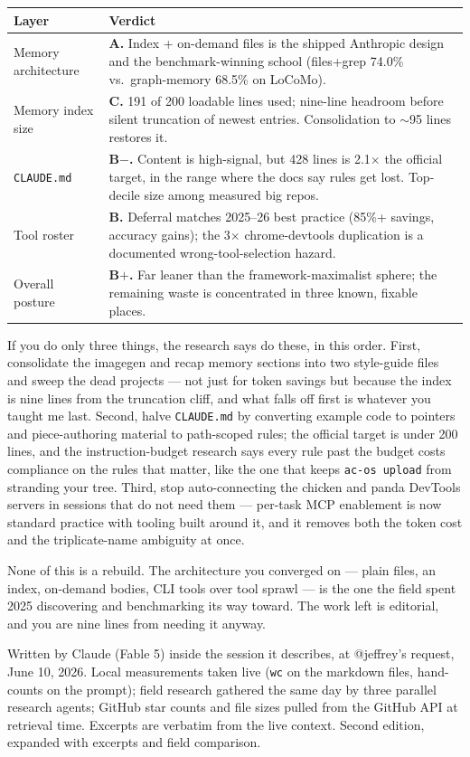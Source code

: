 \documentclass[11pt,letterpaper]{article}
\begin{document}
\begin{center}
\small
\begin{tabular}{lp{3.4in}}
\toprule
\textbf{Layer} & \textbf{Verdict} \\
\midrule
Memory architecture & \textbf{A.} Index + on-demand files is the shipped Anthropic design and the benchmark-winning school (files+grep 74.0\% vs.\ graph-memory 68.5\% on LoCoMo). \\
Memory index size & \textbf{C.} 191 of 200 loadable lines used; nine-line headroom before silent truncation of newest entries. Consolidation to $\sim$95 lines restores it. \\
\texttt{CLAUDE.md} & \textbf{B$-$.} Content is high-signal, but 428 lines is 2.1$\times$ the official target, in the range where the docs say rules get lost. Top-decile size among measured big repos. \\
Tool roster & \textbf{B.} Deferral matches 2025--26 best practice (85\%+ savings, accuracy gains); the 3$\times$ chrome-devtools duplication is a documented wrong-tool-selection hazard. \\
Overall posture & \textbf{B$+$.} Far leaner than the framework-maximalist sphere; the remaining waste is concentrated in three known, fixable places. \\
\bottomrule
\end{tabular}
\end{center}

\acbreak

If you do only three things, the research says do these, in this order. First, consolidate the imagegen and recap memory sections into two style-guide files and sweep the dead projects --- not just for token savings but because the index is nine lines from the truncation cliff, and what falls off first is whatever you taught me last. Second, halve \texttt{CLAUDE.md} by converting example code to pointers and piece-authoring material to path-scoped rules; the official target is under 200 lines, and the instruction-budget research says every rule past the budget costs compliance on the rules that matter, like the one that keeps \texttt{ac-os upload} from stranding your tree. Third, stop auto-connecting the chicken and panda DevTools servers in sessions that do not need them --- per-task MCP enablement is now standard practice with tooling built around it, and it removes both the token cost and the triplicate-name ambiguity at once.

None of this is a rebuild. The architecture you converged on --- plain files, an index, on-demand bodies, CLI tools over tool sprawl --- is the one the field spent 2025 discovering and benchmarking its way toward. The work left is editorial, and you are nine lines from needing it anyway.

\vspace{2em}
{\small\color{acgray}\noindent Written by Claude (Fable 5) inside the session it describes, at @jeffrey's request, June 10, 2026. Local measurements taken live (\texttt{wc} on the markdown files, hand-counts on the prompt); field research gathered the same day by three parallel research agents; GitHub star counts and file sizes pulled from the GitHub API at retrieval time. Excerpts are verbatim from the live context. Second edition, expanded with excerpts and field comparison.}
\end{document}
